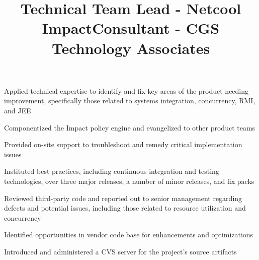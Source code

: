 \documentclass[margin,line]{resume}
\newenvironment{bullet-list}{
  \begin{list}{$\bullet$}{%
      \setlength{\itemsep}{0in}
      \setlength{\parsep}{0in} \setlength{\parskip}{0in}
      \setlength{\topsep}{0in} \setlength{\partopsep}{0in}
      \setlength{\leftmargin}{0.2in}}}{\end{list}}
\begin{document}
\begin{resume}
\title{Technical Team Lead - Netcool Impact}
\begin{position}
\vspace{-.3cm}
\begin{bullet-list}
\item Applied technical expertise to identify and fix key areas of the product
needing improvement, specifically those related to systems integration,
concurrency, RMI, and JEE
\item Componentized the Impact policy engine and evangelized to other product
teams
\item Provided on-site support to troubleshoot and remedy critical implementation
issues
\item Instituted best practices, including continuous integration and
testing technologies, over three major releases, a number of minor
releases, and fix packs
\end{bullet-list}
\end{position}

\title{Consultant - CGS Technology Associates}
\begin{position}
\vspace{-.3cm}
\begin{bullet-list}
\item Reviewed third-party code and reported out to senior management
regarding defects and potential issues, including those related to resource
utilization and concurrency
\item Identified opportunities in vendor code base for enhancements and
optimizations
\item Introduced and administered a CVS server for the project's source
artifacts
\end{bullet-list}
\end{position}


\end{resume}
\end{document}
